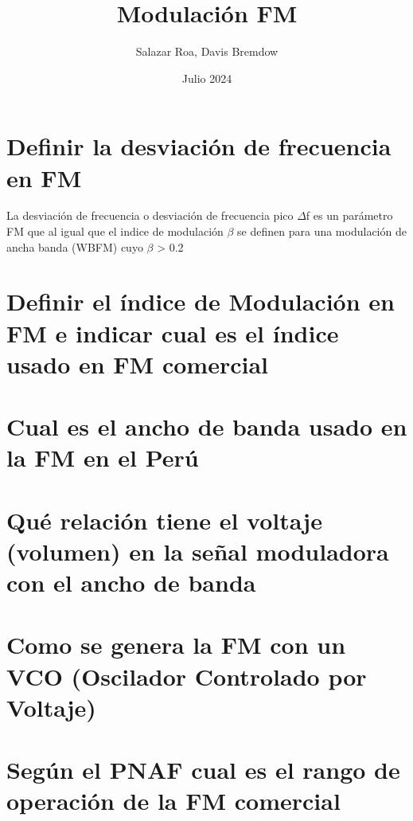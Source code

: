 \documentclass[]{article}
\title{Modulación FM}
\author{Salazar Roa, Davis Bremdow}
\date{ Julio 2024}
\begin{document}
	\maketitle
	\newpage
	
	\section{Definir la desviación de frecuencia en FM}
	La desviación de frecuencia o desviación de frecuencia pico $\Delta$f es un parámetro FM que al igual que el indice de modulación $\beta$ se definen para una modulación de ancha banda (WBFM) cuyo $\beta$ > 0.2
	
	
	\section{Definir el índice de Modulación en FM e indicar cual es el índice usado en FM comercial}
	
	\section{Cual es el ancho de banda usado en la FM en el Perú}
	
	\section{Qué relación tiene el voltaje (volumen) en la señal moduladora con el ancho de banda}
	
	\section{Como se genera la FM con un VCO (Oscilador Controlado por Voltaje)}
	
	
	\section{Según el PNAF cual es el rango de operación de la FM comercial}
\end{document}
